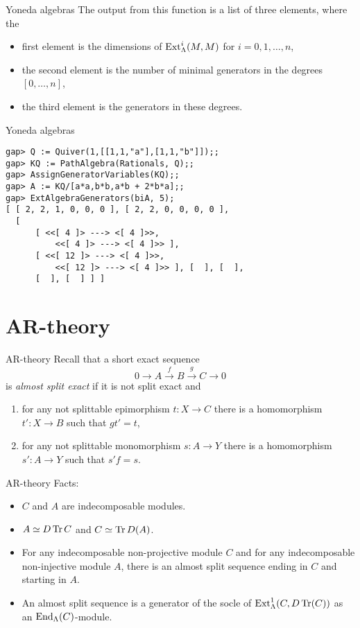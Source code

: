 \begin{frame}[fragile]{Yoneda algebras}
The output from this function is a list of three elements, where the
\begin{itemize}
\item first element is the dimensions of $\operatorname{Ext}\nolimits^i_\Lambda(M,M)$ for
$i=0,1,\ldots,n$, 
\item the second element is the number of minimal generators in the
  degrees $[0,\ldots,n]$, 
\item the third element is the generators in these degrees.
\end{itemize} 
\end{frame}

\begin{frame}[fragile]{Yoneda algebras}
\begin{verbatim}
gap> Q := Quiver(1,[[1,1,"a"],[1,1,"b"]]);;
gap> KQ := PathAlgebra(Rationals, Q);;
gap> AssignGeneratorVariables(KQ);;
gap> A := KQ/[a*a,b*b,a*b + 2*b*a];;
gap> ExtAlgebraGenerators(biA, 5);
[ [ 2, 2, 1, 0, 0, 0 ], [ 2, 2, 0, 0, 0, 0 ], 
  [ 
      [ <<[ 4 ]> ---> <[ 4 ]>>, 
          <<[ 4 ]> ---> <[ 4 ]>> ], 
      [ <<[ 12 ]> ---> <[ 4 ]>>, 
          <<[ 12 ]> ---> <[ 4 ]>> ], [  ], [  ], 
      [  ], [  ] ] ]
\end{verbatim}
\end{frame}

\section{AR-theory}

\begin{frame}[fragile]{AR-theory}
Recall that a short exact sequence 
\[0\to A\xrightarrow{f} B\xrightarrow{g} C\to 0\]
is \emph{almost split exact} if it is not split exact and 
\begin{enumerate}[\rm(i)]
\item for any not splittable epimorphism $t\colon X\to C$ there is a
  homomorphism $t'\colon X\to B$ such that $gt' = t$, 
\item for any not splittable monomorphism $s\colon A\to Y$ there is a
  homomorphism $s'\colon A\to Y$ such that $s'f = s$.
\end{enumerate}
\end{frame}

\begin{frame}[fragile]{AR-theory}
Facts:
\begin{itemize}
\item $C$ and $A$ are indecomposable modules. 
\item $A\simeq D\operatorname{Tr}\nolimits C$ and $C\simeq \operatorname{Tr}\nolimits D(A)$.  
\item For any indecomposable non-projective module $C$ and
for any indecomposable non-injective module $A$, there is an almost
split sequence ending in $C$ and starting in $A$.  
\item An almost split sequence is a generator of the socle of
  $\operatorname{Ext}\nolimits^1_\Lambda(C,D\operatorname{Tr}\nolimits(C))$ as an $\operatorname{End}\nolimits_\Lambda(C)$-module. 
\end{itemize}
\end{frame}

